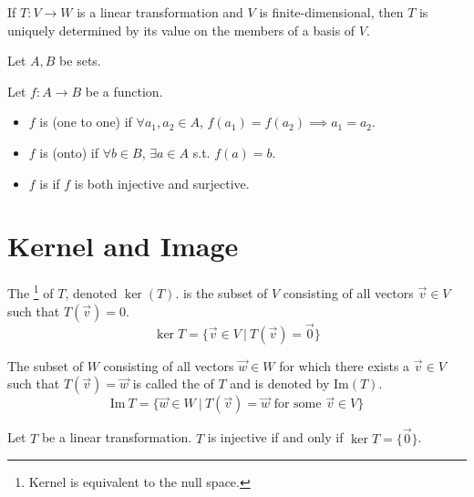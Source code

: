 \documentclass[11pt,fleqn]{book} %
\begin{document}
\setcounter{dummy}{13}
\begin{proposition}
    If $T: V \to W$ is a linear transformation and $V$ is finite-dimensional, then $T$ is uniquely determined by its value on the members of a basis of $V$. 
\end{proposition}

\setcounter{section}{0}
\begin{definition}
    Let $A, B$ be sets. 

    Let $f: A \to B$ be a function. 

    \begin{itemize}
        \item $f$ is  (one to one) if $\forall a_1, a_2 \in A$, $f(a_1) = f(a_2) \implies a_1 = a_2$. 

        \item $f$ is  (onto) if $\forall b \in B$, $\exists a \in A$ s.t. $f(a) = b$. 

        \item $f$ is  if $f$ is both injective and surjective. 
    \end{itemize}
\end{definition}
\setcounter{section}{1}

\section{Kernel and Image}

\setcounter{section}{3}
\begin{definition}[Kernel]
    The \footnote{Kernel is equivalent to the null space. } of $T$, denoted $\ker(T)$. is the subset of $V$ consisting of all vectors $\vec{v} \in V$ such that $T(\vec{v}) = 0$. $$\ker T=\{ \vec{v} \in V ~|~ T(\vec{v}) = \vec{0} \}$$
\end{definition}

\setcounter{definitionT}{9}
\begin{definition}[Image]
    The subset of $W$ consisting of all vectors $\vec{w} \in W$ for which there exists a $\vec{v} \in V$ such that $T(\vec{v}) = \vec{w}$ is called the  of $T$ and is denoted by $\mathrm{Im}(T)$. $$\mathrm{Im}~T = \{ \vec{w} \in W ~|~ T(\vec{v}) = \vec{w} \text{ for some } \vec{v} \in V \}$$
\end{definition}

\setcounter{section}{0}
\begin{proposition}
    Let $T$ be a linear transformation. $T$ is injective if and only if $\ker T = \{ \vec{0} \}$. 
\end{proposition}
\end{document}
